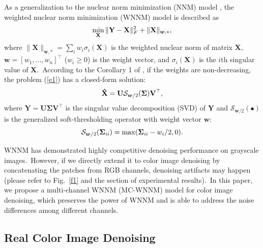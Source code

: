 \documentclass[10pt,twocolumn,letterpaper]{article}
\begin{document}
As a generalization to the nuclear norm minimization (NNM) model \cite{cai2010singular}, the weighted nuclear norm minimization (WNNM) model \cite{wnnm,wnnmijcv} is described as 
\vspace{-3mm}
\begin{equation}
\label{e1}
\vspace{-3mm}
\min_{\mathbf{X}}\|\mathbf{Y}-\mathbf{X}\|_{F}^{2}
+
\|\mathbf{X}\|_{\bm{w},*},
\end{equation}
where $\|\mathbf{X}\|_{\bm{w},*}=\sum_{i}w_{i}\sigma_{i}(\mathbf{X})$ is the weighted nuclear norm of matrix $\mathbf{X}$, $\bm{w}=[w_{1},...,w_{n}]^{\top}$ ($w_{i}\ge 0$) is the weight vector, and $\sigma_{i}(\mathbf{X})$ is the $i$th singular value of $\mathbf{X}$.\ According to the Corollary 1 of \cite{wnnmijcv}, if the weights are non-decreasing, the problem (\ref{e1}) has a closed-form solution:
\vspace{-3mm}  
\begin{equation}
\label{e2}
\vspace{-3mm}
\mathbf{\hat{X}}
=
\mathbf{U}
\mathcal{S}_{\bm{w}/2}
(\mathbf{\Sigma})
\mathbf{V}^{\top},
\end{equation}
where $\mathbf{Y}=\mathbf{U}\mathbf{\Sigma}\mathbf{V}^{\top}$ is the singular value decomposition (SVD) \cite{eckart1936approximation} of $\mathbf{Y}$ and 
$\mathcal{S}_{\bm{w}/2}(\bullet)$ is the generalized soft-thresholding operator with weight vector $\bm{w}$:
\vspace{-3mm}
\begin{equation}
\label{e3}
\vspace{-3mm}
\mathcal{S}_{\bm{w}/2}
(\mathbf{\Sigma}_{ii})
=
\max(\mathbf{\Sigma}_{ii}-w_{i}/2, 0).
\end{equation}

WNNM has demonstrated highly competitive denoising performance on grayscale images.\ However, if we directly extend it to color image denoising by concatenating the patches from RGB channels, denoising artifacts may happen (please refer to Fig.\ \ref{f1} and the section of experimental results).\ In this paper, we propose a multi-channel WNNM (MC-WNNM) model for color image denoising, which preserves the power of WNNM and is able to address the noise differences among different channels.

\vspace{-1mm}
\subsection{Real Color Image Denoising}
\vspace{-1mm}
\end{document}
